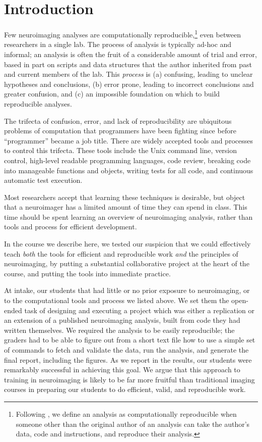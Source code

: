 \section{Introduction}

Few neuroimaging analyses are computationally reproducible,\footnote{Following
\citet{buckheit1995wavelab}, we define an analysis as computationally
reproducible when someone other than the original author of an analysis can
take the author's data, code and instructions, and reproduce their analysis.}
even between researchers in a single lab.
The process of analysis is typically ad-hoc and informal; an analysis is often
the fruit of a considerable amount of trial and error, based in part on scripts
and data structures that the author inherited from past and current members of
the lab.
This \emph{process} is
(a) confusing, leading to unclear hypotheses and conclusions,
(b) error prone, leading to incorrect conclusions and greater confusion,
and (c) an impossible foundation on which to build reproducible analyses.

The trifecta of confusion, error, and lack of reproducibility are ubiquitous
problems of computation that programmers have been fighting since before ``programmer''
became a job title. There are widely accepted tools and processes to
control this trifecta. These tools include the Unix command line, version
control, high-level readable programming languages, code review, breaking code
into manageable functions and objects, writing tests for all code,  and
continuous automatic test execution.

Most researchers accept that learning these techniques is desirable, but
object that a neuroimager has a limited amount of time they can spend in
class.  This time should be spent learning an overview of neuroimaging
analysis, rather than tools and process for efficient development.

In the course we describe here, we tested our suspicion that we could
effectively teach \emph{both} the tools for efficient and reproducible work \emph{and}
the principles of neuroimaging, by putting a substantial collaborative project
at the heart of the course, and putting the tools into immediate practice.

At intake, our students that had little or no prior exposure to neuroimaging,
or to the computational tools and process we listed above.  We set them the
open-ended task of designing and executing a project which was either a
replication or an extension of a published neuroimaging analysis, built from
code they had written themselves.  We required the analysis to be easily
reproducible; the graders had to be able to figure out from a short text file
how to use a simple set of commands to
fetch and validate the data, run the analysis, and generate the final report, including the
figures.  As we report in the results, our students were remarkably
successful in achieving this goal.  We argue that this approach to
training in neuroimaging is likely to be far more fruitful than traditional
imaging courses in preparing our students to do efficient, valid, and
reproducible work.

